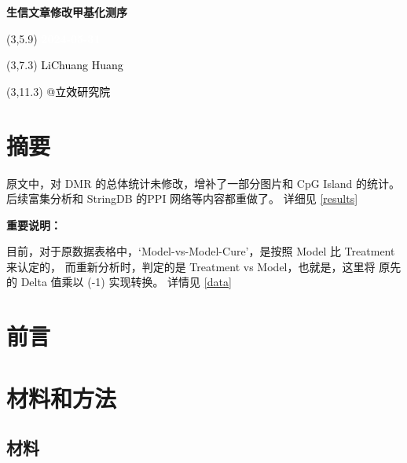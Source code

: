 \documentclass[
]{article}
\author{}
\date{\vspace{-2.5em}}
\begin{document}
\begin{titlepage} 
\begin{center} \textbf{\Huge
生信文章修改甲基化测序} \vspace{4em}
\begin{textblock}{10}(3,5.9) \huge
\textbf{\textcolor{white}{2024-05-31}}
\end{textblock} \begin{textblock}{10}(3,7.3)
\Large \textcolor{black}{LiChuang Huang}
\end{textblock} \begin{textblock}{10}(3,11.3)
\Large \textcolor{black}{@立效研究院}
\end{textblock} \end{center} \end{titlepage}
\restoregeometry


\tableofcontents

\listoffigures

\listoftables

\newpage


\hypertarget{abstract}{%
\section{摘要}\label{abstract}}

原文中，对 DMR 的总体统计未修改，增补了一部分图片和 CpG Island 的统计。
后续富集分析和 StringDB 的PPI 网络等内容都重做了。
详细见 \ref{results}

\textbf{重要说明：}

目前，对于原数据表格中，`Model-vs-Model-Cure'，是按照 Model 比 Treatment 来认定的，
而重新分析时，判定的是 Treatment vs Model，也就是，这里将 原先的 Delta 值乘以 (-1) 实现转换。
详情见 \ref{data}

\hypertarget{introduction}{%
\section{前言}\label{introduction}}

\hypertarget{methods}{%
\section{材料和方法}\label{methods}}

\hypertarget{ux6750ux6599}{%
\subsection{材料}\label{ux6750ux6599}}
\end{document}
